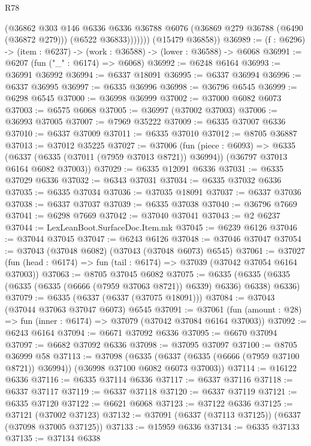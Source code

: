 \begin{lexlean}{R78}
\begin{coremodule}
                (@36862
                  @303
                  @146
                  @6336
                  @6336
                  @36788
                  @6076
                  (@36869 @279 @36788 (@6490 (@36872 @279)))
                  (@6522 @36833)))))))
      (@15479 @36858))
@36989 := (f : @6296) -> (item : @6237) -> (work : @36588) -> (lower : @36588) -> @6068
@36991 := @6207 (fun ("_" : @6174) => @6068)
@36992 := @6248 @6164
@36993 := @36991 @36992
@36994 := @6337 @18091
@36995 := @6337 @36994
@36996 := @6337 @36995
@36997 := @6335 @36996
@36998 := @36796 @6545
@36999 := @6298 @6545
@37000 := @36998 @36999
@37002 := @37000 @6082 @6073
@37003 := @6575 @6068
@37005 := @36997 (@37002 @37003)
@37006 := @36993 @37005
@37007 := @7969 @35222
@37009 := @6335 @37007 @6336
@37010 := @6337 @37009
@37011 := @6335 @37010
@37012 := @8705 @36887
@37013 := @37012 @35225
@37027 := @37006
    (fun (piece : @6093) =>
    @6335 (@6337 (@6335 (@37011 (@7959 @37013 @8721)) @36994)) (@36797 @37013 @6164 @6082 @37003))
@37029 := @6335 @12091 @6336
@37031 := @6335 @37029 @6336
@37032 := @6343 @37031
@37034 := @6335 @37032 @6336
@37035 := @6335 @37034
@37036 := @37035 @18091
@37037 := @6337 @37036
@37038 := @6337 @37037
@37039 := @6335 @37038
@37040 := @36796 @7669
@37041 := @6298 @7669
@37042 := @37040 @37041
@37043 := @2 @6237
@37044 := LexLeanBoot.SurfaceDoc.Item.mk
@37045 := @6239 @6126
@37046 := @37044 @37045
@37047 := @6243 @6126
@37048 := @37046 @37047
@37054 := @37043 (@37048 @6082) (@37043 (@37048 @6073) @6545)
@37061 := @37027 (fun (head : @6174) => fun (tail : @6174) => @37039 (@37042 @37054 @6164 @37003))
@37063 := @8705 @37045 @6082
@37075 := @6335 (@6335 (@6335 (@6335 (@6335 (@6666 (@7959 @37063 @8721)) @6339) @6336) @6338) @6336)
@37079 := @6335 (@6337 (@6337 (@37075 @18091)))
@37084 := @37043 (@37044 @37063 @37047 @6073) @6545
@37091 := @37061 (fun (amount : @28) => fun (inner : @6174) => @37079 (@37042 @37084 @6164 @37003))
@37092 := @6243 @6164
@37094 := @6671 @37092 @6336
@37095 := @6670 @37094
@37097 := @6682 @37092 @6336
@37098 := @37095 @37097
@37100 := @8705 @36999 @58
@37113 := @37098
    (@6335 (@6337 (@6335 (@6666 (@7959 @37100 @8721)) @36994)) (@36998 @37100 @6082 @6073 @37003))
@37114 := @16122 @6336
@37116 := @6335 @37114 @6336
@37117 := @6337 @37116
@37118 := @6337 @37117
@37119 := @6337 @37118
@37120 := @6337 @37119
@37121 := @6335 @37120
@37122 := @6621 @6068
@37123 := @37122 @6336
@37125 := @37121 (@37002 @37123)
@37132 := @37091 (@6337 (@37113 @37125)) (@6337 (@37098 @37005 @37125))
@37133 := @15959 @6336
@37134 := @6335 @37133
@37135 := @37134 @6338

\end{coremodule}
\end{lexlean}
